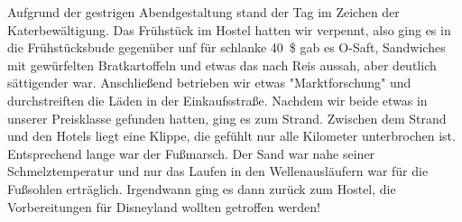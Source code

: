 Aufgrund der gestrigen Abendgestaltung stand der Tag im Zeichen der Katerbewältigung.
Das Frühstück im Hostel hatten wir verpennt, also ging es in die Frühstücksbude gegenüber unf für schlanke 40~\$ gab es O-Saft, Sandwiches mit gewürfelten Bratkartoffeln und etwas das nach Reis aussah, aber deutlich sättigender war.
Anschließend betrieben wir etwas "Marktforschung" und durchstreiften die Läden in der Einkaufsstraße.
Nachdem wir beide etwas in unserer Preisklasse gefunden hatten, ging es zum Strand.
Zwischen dem Strand und den Hotels liegt eine Klippe, die gefühlt nur alle Kilometer unterbrochen ist.
Entsprechend lange war der Fußmarsch.
Der Sand war nahe seiner Schmelztemperatur und nur das Laufen in den Wellenausläufern war für die Fußsohlen erträglich.
Irgendwann ging es dann zurück zum Hostel, die Vorbereitungen für Disneyland wollten getroffen werden!

